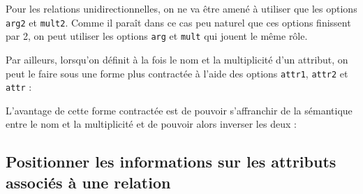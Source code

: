\documentclass[a4paper,11pt]{report}
\newcommand{\inputTikZ}[1]{%
  }%
\newcommand{\inputTikZ}[1]{%
    \texttt{[image: fig/\#1.pdf]}%
  }%
\begin{document}
\begin{minipage}{0.5\textwidth}

\end{minipage}
\begin{minipage}{0.4\textwidth}
\begin{center}
\inputTikZ{figure14}
\end{center}
\end{minipage}

\medskip

Pour les relations unidirectionnelles, on ne va être amené à utiliser que les options {\tt arg2} et {\tt mult2}. Comme il paraît dans ce cas peu naturel que ces options finissent par 2, on peut utiliser les options {\tt arg} et {\tt mult} qui jouent le même rôle.

Par ailleurs, lorsqu'on définit à la fois le nom et la multiplicité d'un attribut, on peut le faire sous une forme plus contractée à l'aide des options {\tt attr1}, {\tt attr2} et {\tt attr} :

\medskip

\begin{minipage}{0.5\textwidth}

\end{minipage}
\begin{minipage}{0.4\textwidth}
\begin{center}
\inputTikZ{figure15}
\end{center}
\end{minipage}

\medskip

L'avantage de cette forme contractée est de pouvoir s'affranchir de la sémantique entre le nom et la multiplicité et de pouvoir alors inverser les deux :

\medskip

\begin{minipage}{0.5\textwidth}

\end{minipage}
\begin{minipage}{0.4\textwidth}
\begin{center}
\inputTikZ{figure16}
\end{center}
\end{minipage}

\medskip

\subsection{Positionner les informations sur les attributs associés à une relation}\label{ss.relposattr}
\end{document}
